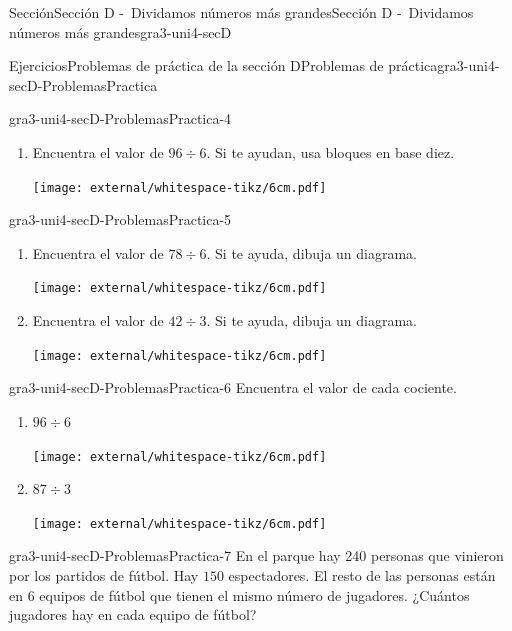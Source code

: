 \begin{sectionptx}{Sección}{Sección D -~Dividamos números más grandes}{}{Sección D -~Dividamos números más grandes}{}{}{gra3-uni4-secD}
\begin{exercises-subsection}{Ejercicios}{Problemas de práctica de la sección D}{}{Problemas de práctica}{}{}{gra3-uni4-secD-ProblemasPractica}
\begin{divisionexercise}{2}{}{}{gra3-uni4-secD-ProblemasPractica-4}
\begin{enumerate}[label={(\alph*)}]
\clearpage
\item{}Encuentra el valor de \(96 \div 6\). Si te ayudan, usa bloques en base diez.%
\begin{image}{0}{1}{0}{}%
\texttt{[image: external/whitespace-tikz/6cm.pdf]}
\end{image}%
\end{enumerate}
\end{divisionexercise}%
\begin{divisionexercise}{3}{}{}{gra3-uni4-secD-ProblemasPractica-5}%
%
\vspace{-1.35\baselineskip}
\begin{enumerate}[label={(\alph*)}]
\item{}Encuentra el valor de \(78 \div 6\). Si te ayuda, dibuja un diagrama.%
\begin{image}{0}{1}{0}{}%
\texttt{[image: external/whitespace-tikz/6cm.pdf]}
\end{image}%
\item{}Encuentra el valor de \(42 \div 3\). Si te ayuda, dibuja un diagrama.%
\begin{image}{0}{1}{0}{}%
\texttt{[image: external/whitespace-tikz/6cm.pdf]}
\end{image}%
\end{enumerate}
\end{divisionexercise}%
\begin{divisionexercise}{4}{}{}{gra3-uni4-secD-ProblemasPractica-6}%
Encuentra el valor de cada cociente.%
%
\begin{enumerate}[label={(\alph*)}]
\item{}\(\displaystyle 96 \div 6\)%
\begin{image}{0}{1}{0}{}%
\texttt{[image: external/whitespace-tikz/6cm.pdf]}
\end{image}%
\item{}\(\displaystyle 87 \div 3\)%
\begin{image}{0}{1}{0}{}%
\texttt{[image: external/whitespace-tikz/6cm.pdf]}
\end{image}%
\end{enumerate}
\end{divisionexercise}%
\clearpage
\begin{divisionexercise}{5}{}{}{gra3-uni4-secD-ProblemasPractica-7}%
En el parque hay 240 personas que vinieron por los partidos de fútbol. Hay \(150\) espectadores. El resto de las personas están en \(6\) equipos de fútbol que tienen el mismo número de jugadores. ¿Cuántos jugadores hay en cada equipo de fútbol?%
%
\begin{enumerate}[label={(\alph*)}]

\end{enumerate}
\end{divisionexercise}
\end{exercises-subsection}
\end{sectionptx}
